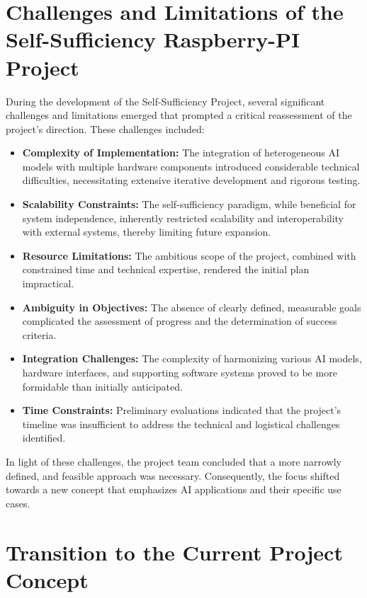 \cite{SAIPIA-Concept}

\section{Challenges and Limitations of the Self-Sufficiency Raspberry-PI Project}

During the development of the Self-Sufficiency Project, several significant challenges and limitations emerged that prompted a critical reassessment of the project’s direction. These challenges included:
\begin{itemize}
    \item \textbf{Complexity of Implementation:} The integration of heterogeneous AI models with multiple hardware components introduced considerable technical difficulties, necessitating extensive iterative development and rigorous testing.
    \item \textbf{Scalability Constraints:} The self-sufficiency paradigm, while beneficial for system independence, inherently restricted scalability and interoperability with external systems, thereby limiting future expansion.
    \item \textbf{Resource Limitations:} The ambitious scope of the project, combined with constrained time and technical expertise, rendered the initial plan impractical.
    \item \textbf{Ambiguity in Objectives:} The absence of clearly defined, measurable goals complicated the assessment of progress and the determination of success criteria.
    \item \textbf{Integration Challenges:} The complexity of harmonizing various AI models, hardware interfaces, and supporting software systems proved to be more formidable than initially anticipated.
    \item \textbf{Time Constraints:} Preliminary evaluations indicated that the project’s timeline was insufficient to address the technical and logistical challenges identified.
\end{itemize}

In light of these challenges, the project team concluded that a more narrowly defined, and feasible approach was necessary. Consequently, the focus shifted towards a new concept that emphasizes AI applications and their specific use cases.

\section{Transition to the Current Project Concept}

